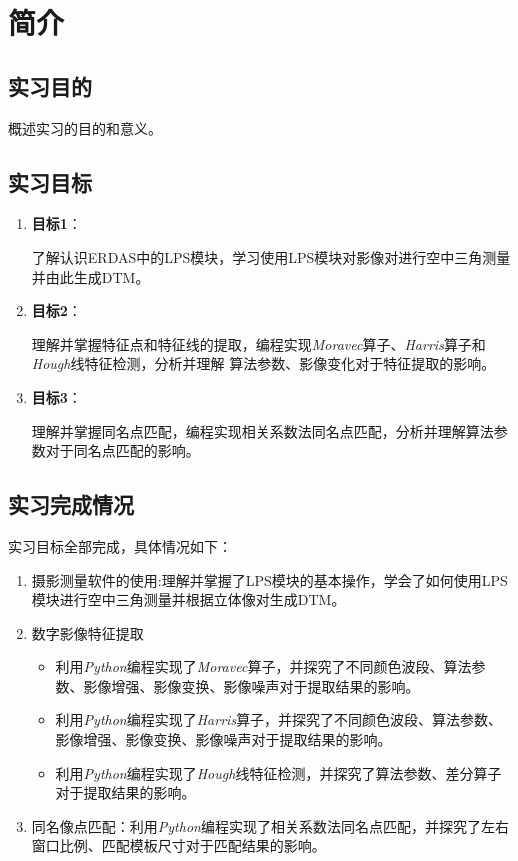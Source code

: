 \section{简介}
\subsection{实习目的}
概述实习的目的和意义。

\subsection{实习目标}
\begin{enumerate}
    \item \textbf{目标1}：
    
    \hspace{24pt}了解认识ERDAS中的LPS模块，学习使用LPS模块对影像对进行空中三角测量并由此生成DTM。

    \item \textbf{目标2}：
    
    \hspace{24pt}理解并掌握特征点和特征线的提取，编程实现\textit{Moravec}算子、\textit{Harris}算子和\textit{Hough}线特征检测，分析并理解
    算法参数、影像变化对于特征提取的影响。

    \item \textbf{目标3}：
    
    \hspace{24pt}理解并掌握同名点匹配，编程实现相关系数法同名点匹配，分析并理解算法参数对于同名点匹配的影响。
\end{enumerate}

\subsection{实习完成情况}
    实习目标全部完成，具体情况如下：
    \begin{enumerate}
        \item 摄影测量软件的使用:理解并掌握了LPS模块的基本操作，学会了如何使用LPS模块进行空中三角测量并根据立体像对生成DTM。
        \item 数字影像特征提取
        \begin{itemize}
            \item 利用\textit{Python}编程实现了\textit{Moravec}算子，并探究了不同颜色波段、算法参数、影像增强、影像变换、影像噪声对于提取结果的影响。
            \item 利用\textit{Python}编程实现了\textit{Harris}算子，并探究了不同颜色波段、算法参数、影像增强、影像变换、影像噪声对于提取结果的影响。
            \item 利用\textit{Python}编程实现了\textit{Hough}线特征检测，并探究了算法参数、差分算子对于提取结果的影响。
        \end{itemize}
        \item 同名像点匹配：利用\textit{Python}编程实现了相关系数法同名点匹配，并探究了左右窗口比例、匹配模板尺寸对于匹配结果的影响。
    \end{enumerate}
